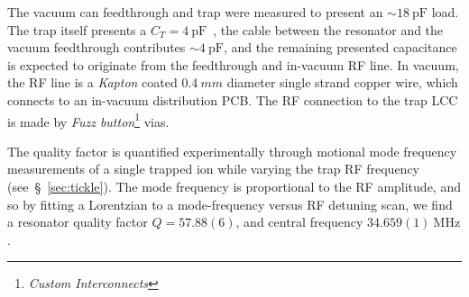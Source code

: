     The vacuum can
    feedthrough and trap were measured to present an $\sim
    18~\unit{\pico\farad}$ load. The trap itself presents a
    $C_T=4~\unit{\pico\farad}$~\cite{wilpers_compact_2013}, the cable between the
    resonator and the vacuum feedthrough contributes $\sim
    4~\unit{\pico\farad}$, and the remaining presented capacitance is expected
    to originate from the feedthrough and in-vacuum RF line. In vacuum, the RF line is a \emph{Kapton} coated $0.4~\unit{mm}$ diameter single strand copper wire, which connects to an in-vacuum distribution PCB. The RF connection to the trap LCC is made by \emph{Fuzz button}\footnote{\emph{Custom Interconnects}} vias.

    The quality factor is quantified experimentally through motional mode frequency measurements of a single trapped ion while varying the trap RF frequency (see~\S~\ref{sec:tickle}). The mode frequency is proportional to the RF amplitude, and so by fitting a Lorentzian to a mode-frequency versus RF detuning scan, we find a resonator quality factor 
    $Q=57.88(6)$, and central
    frequency $34.659(1)~\unit{\mega\hertz}$.

